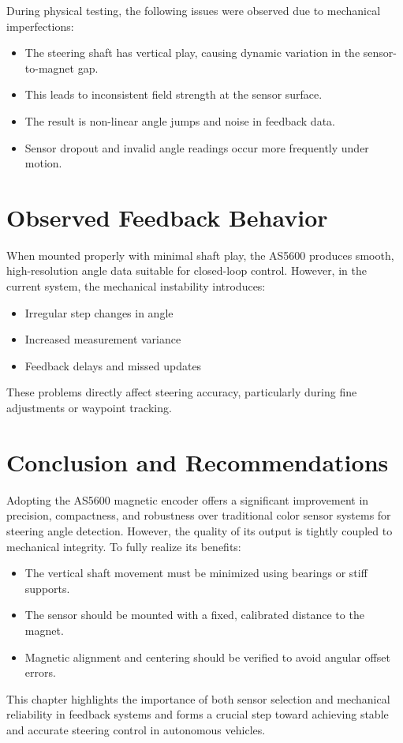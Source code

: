 During physical testing, the following issues were observed due to mechanical imperfections:
\begin{itemize}
    \item The steering shaft has vertical play, causing dynamic variation in the sensor-to-magnet gap.
    \item This leads to inconsistent field strength at the sensor surface.
    \item The result is non-linear angle jumps and noise in feedback data.
    \item Sensor dropout and invalid angle readings occur more frequently under motion.
\end{itemize}

\section{Observed Feedback Behavior}

When mounted properly with minimal shaft play, the AS5600 produces smooth, high-resolution angle data suitable for closed-loop control. However, in the current system, the mechanical instability introduces:
\begin{itemize}
    \item Irregular step changes in angle
    \item Increased measurement variance
    \item Feedback delays and missed updates
\end{itemize}

These problems directly affect steering accuracy, particularly during fine adjustments or waypoint tracking.

\section{Conclusion and Recommendations}

Adopting the AS5600 magnetic encoder offers a significant improvement in precision, compactness, and robustness over traditional color sensor systems for steering angle detection. However, the quality of its output is tightly coupled to mechanical integrity. To fully realize its benefits:
\begin{itemize}
    \item The vertical shaft movement must be minimized using bearings or stiff supports.
    \item The sensor should be mounted with a fixed, calibrated distance to the magnet.
    \item Magnetic alignment and centering should be verified to avoid angular offset errors.
\end{itemize}

This chapter highlights the importance of both sensor selection and mechanical reliability in feedback systems and forms a crucial step toward achieving stable and accurate steering control in autonomous vehicles.
